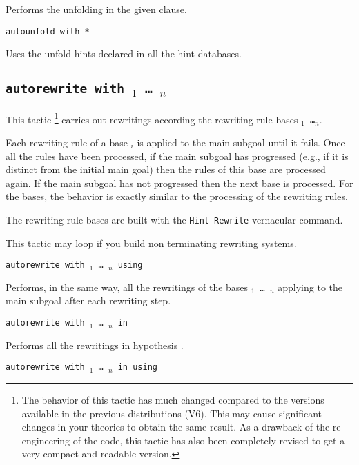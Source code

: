 \begin{coq_example*}
\begin{Variants}
  Performs the unfolding in the given clause.

\item {\tt autounfold with *}

  Uses the unfold hints declared in all the hint databases.
\end{Variants}


\subsection{\tt autorewrite with \ident$_1$ \mbox{\dots} \ident$_n$}
\label{tactic:autorewrite}

This tactic \footnote{The behavior of this tactic has much changed compared to
the versions available in the previous distributions (V6). This may cause
significant changes in your theories to obtain the same result. As a drawback
of the re-engineering of the code, this tactic has also been completely revised
to get a very compact and readable version.} carries out rewritings according
the rewriting rule bases {\tt \ident$_1$ \dots \ident$_n$}.

Each rewriting rule of a base \ident$_i$ is applied to the main subgoal until
it fails. Once all the rules have been processed, if the main subgoal has
progressed (e.g., if it is distinct from the initial main goal) then the rules
of this base are processed again. If the main subgoal has not progressed then
the next base is processed. For the bases, the behavior is exactly similar to
the processing of the rewriting rules.

The rewriting rule bases are built with the {\tt Hint~Rewrite} vernacular
command.

\Warning{} This tactic may loop if you build non terminating rewriting systems.

\begin{Variant}
\item {\tt autorewrite with \ident$_1$ \mbox{\dots} \ident$_n$ using \tac}

Performs, in the same way, all the rewritings of the bases {\tt \ident$_1$
\mbox{\dots} \ident$_n$} applying {\tt \tac} to the main subgoal after each
rewriting step.

\item {\tt autorewrite with \ident$_1$ \mbox{\dots} \ident$_n$ in \qualid}

  Performs all the rewritings in hypothesis {\qualid}.
\item {\tt autorewrite with \ident$_1$ \mbox{\dots} \ident$_n$ in {\qualid} using \tac}


\end{Variant}
\end{coq_example*}
